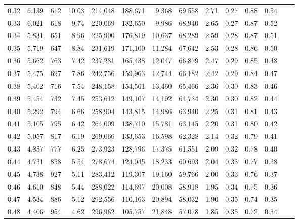 \begin{tabular}{rrrrrrrrrrrrrr}
0.32 &  6,139 &    612 &   10.03 &  214,048 &  188,671 &   9,368 &  69,558 &  2.71 &  0.27 &  0.88 &      0.54 \\
0.33 &  6,021 &    618 &    9.74 &  220,069 &  182,650 &   9,986 &  68,940 &  2.65 &  0.27 &  0.87 &      0.52 \\
0.34 &  5,831 &    651 &    8.96 &  225,900 &  176,819 &  10,637 &  68,289 &  2.59 &  0.28 &  0.87 &      0.51 \\
0.35 &  5,719 &    647 &    8.84 &  231,619 &  171,100 &  11,284 &  67,642 &  2.53 &  0.28 &  0.86 &      0.50 \\
0.36 &  5,662 &    763 &    7.42 &  237,281 &  165,438 &  12,047 &  66,879 &  2.47 &  0.29 &  0.85 &      0.48 \\
0.37 &  5,475 &    697 &    7.86 &  242,756 &  159,963 &  12,744 &  66,182 &  2.42 &  0.29 &  0.84 &      0.47 \\
0.38 &  5,402 &    716 &    7.54 &  248,158 &  154,561 &  13,460 &  65,466 &  2.36 &  0.30 &  0.83 &      0.46 \\
0.39 &  5,454 &    732 &    7.45 &  253,612 &  149,107 &  14,192 &  64,734 &  2.30 &  0.30 &  0.82 &      0.44 \\
0.40 &  5,292 &    794 &    6.66 &  258,904 &  143,815 &  14,986 &  63,940 &  2.25 &  0.31 &  0.81 &      0.43 \\
0.41 &  5,105 &    795 &    6.42 &  264,009 &  138,710 &  15,781 &  63,145 &  2.20 &  0.31 &  0.80 &      0.42 \\
0.42 &  5,057 &    817 &    6.19 &  269,066 &  133,653 &  16,598 &  62,328 &  2.14 &  0.32 &  0.79 &      0.41 \\
0.43 &  4,857 &    777 &    6.25 &  273,923 &  128,796 &  17,375 &  61,551 &  2.09 &  0.32 &  0.78 &      0.40 \\
0.44 &  4,751 &    858 &    5.54 &  278,674 &  124,045 &  18,233 &  60,693 &  2.04 &  0.33 &  0.77 &      0.38 \\
0.45 &  4,738 &    927 &    5.11 &  283,412 &  119,307 &  19,160 &  59,766 &  2.00 &  0.33 &  0.76 &      0.37 \\
0.46 &  4,610 &    848 &    5.44 &  288,022 &  114,697 &  20,008 &  58,918 &  1.95 &  0.34 &  0.75 &      0.36 \\
0.47 &  4,534 &    886 &    5.12 &  292,556 &  110,163 &  20,894 &  58,032 &  1.90 &  0.35 &  0.74 &      0.35 \\
0.48 &  4,406 &    954 &    4.62 &  296,962 &  105,757 &  21,848 &  57,078 &  1.85 &  0.35 &  0.72 &      0.34 \\

\end{tabular}
